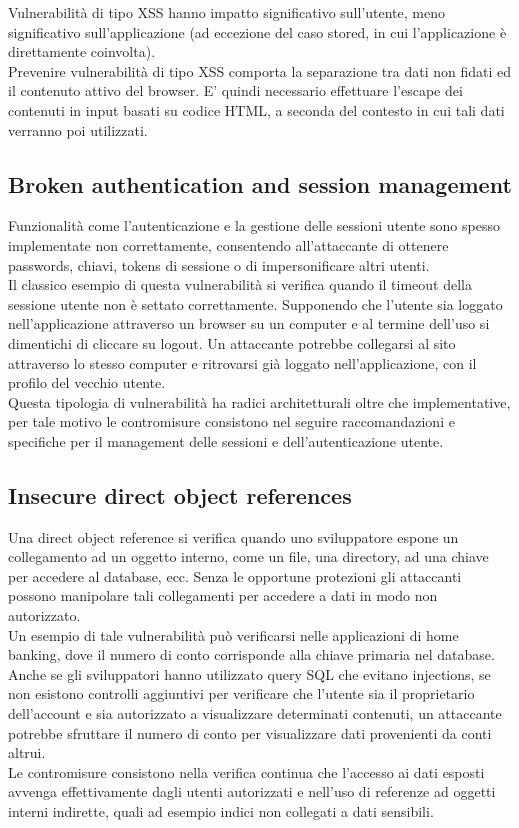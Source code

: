 Vulnerabilità di tipo XSS hanno impatto significativo sull'utente, meno significativo sull'applicazione (ad eccezione del caso stored, in cui l'applicazione è direttamente coinvolta).\\
Prevenire vulnerabilità di tipo XSS comporta la separazione tra dati non fidati ed il contenuto attivo del browser. E' quindi necessario effettuare l'escape dei contenuti in input basati su codice HTML, a seconda del contesto in cui tali dati verranno poi utilizzati.

\subsection{Broken authentication and session management}
Funzionalità come l'autenticazione e la gestione delle sessioni utente sono spesso implementate non correttamente, consentendo all'attaccante di ottenere passwords, chiavi, tokens di sessione o di impersonificare altri utenti.\\
Il classico esempio di questa vulnerabilità si verifica quando il timeout della sessione utente non è settato correttamente. Supponendo che l'utente sia loggato nell'applicazione attraverso un browser su un computer e al termine dell'uso si dimentichi di cliccare su logout. Un attaccante potrebbe collegarsi al sito attraverso lo stesso computer e ritrovarsi già loggato nell'applicazione, con il profilo del vecchio utente. \\
Questa tipologia di vulnerabilità ha radici architetturali oltre che implementative, per tale motivo le contromisure consistono nel seguire raccomandazioni e specifiche per il management delle sessioni e dell'autenticazione utente.

\subsection{Insecure direct object references}
Una direct object reference si verifica quando uno sviluppatore espone un collegamento ad un oggetto interno, come un file, una directory, ad una chiave per accedere al database, ecc. Senza le opportune protezioni gli attaccanti possono manipolare tali collegamenti per accedere a dati in modo non autorizzato.\\
Un esempio di tale vulnerabilità può verificarsi nelle applicazioni di home banking, dove il numero di conto corrisponde alla chiave primaria nel database. Anche se gli sviluppatori hanno utilizzato query SQL che evitano injections, se non esistono controlli aggiuntivi per verificare che l'utente sia il proprietario dell'account e sia autorizzato a visualizzare determinati contenuti, un attaccante potrebbe sfruttare il numero di conto per visualizzare dati provenienti da conti altrui.\\
Le contromisure consistono nella verifica continua che l'accesso ai dati esposti avvenga effettivamente dagli utenti autorizzati e nell'uso di referenze ad oggetti interni indirette, quali ad esempio indici non collegati a dati sensibili. 

